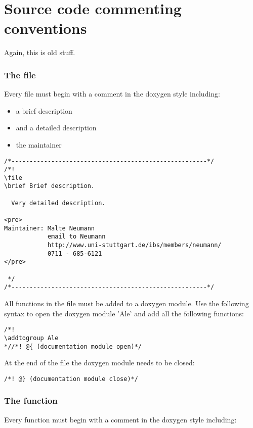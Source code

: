 \chapter{Source code commenting conventions}

Again, this is old stuff.

\subsection{The file}

Every file must begin with a comment in the doxygen style including: 

\begin{itemize}
\item a brief description
\item and a detailed description
\item the maintainer
\end{itemize}

\begin{verbatim}
/*------------------------------------------------------*/
/*!
\file
\brief Brief description.

  Very detailed description.

<pre>
Maintainer: Malte Neumann
            email to Neumann
            http://www.uni-stuttgart.de/ibs/members/neumann/
            0711 - 685-6121
</pre>

 */
/*------------------------------------------------------*/
\end{verbatim}

All functions in the file must be added to a doxygen module. Use the
following syntax to open the doxygen module 'Ale' and add all the
following functions:

\begin{verbatim}
/*!
\addtogroup Ale
*//*! @{ (documentation module open)*/
\end{verbatim}

 At the end of the file the doxygen module needs to be closed: 

\begin{verbatim}
/*! @} (documentation module close)*/
\end{verbatim}

\subsection{The function}

Every function must begin with a comment in the doxygen style including: 

